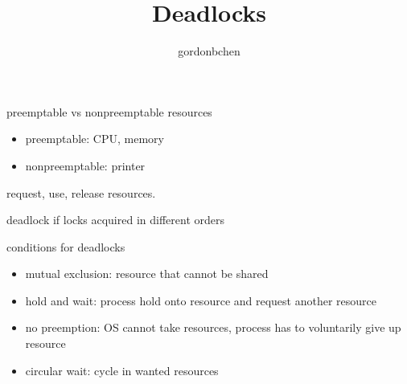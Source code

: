 \documentclass[11pt]{article}
\title{Deadlocks}
\author{gordonbchen}
\date{}
\begin{document}
\maketitle

\section{}
preemptable vs nonpreemptable resources
\begin{itemize}
    \item preemptable: CPU, memory
    \item nonpreemptable: printer
\end{itemize}

request, use, release resources.

deadlock if locks acquired in different orders

conditions for deadlocks
\begin{itemize}
    \item mutual exclusion: resource that cannot be shared
    \item hold and wait: process hold onto resource and request another resource
    \item no preemption: OS cannot take resources, process has to voluntarily give up resource
    \item circular wait: cycle in wanted resources
\end{itemize}
\end{document}
